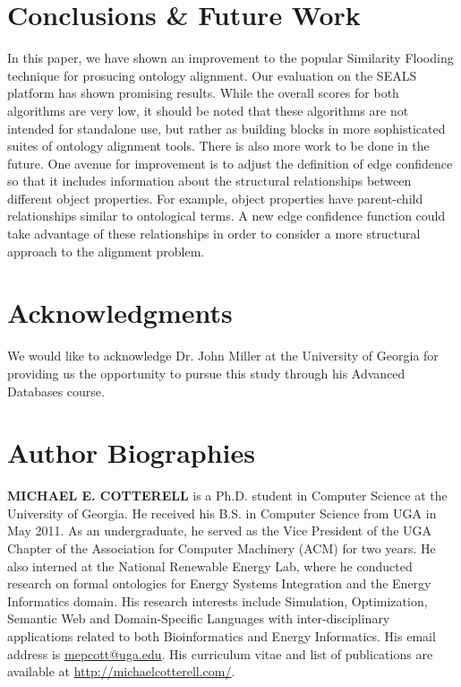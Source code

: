 \documentclass[letterpaper,twocolumn,12pt]{article}
\begin{document}
\section{Conclusions \& Future Work}
\label{sec:conclusions}
In this paper, we have shown an improvement to the popular
Similarity Flooding technique for prosucing ontology alignment.
Our evaluation on the SEALS platform has shown promising results. While the overall
scores for both algorithms are very low, it should be noted that these algorithms
are not intended for standalone use, but rather as building blocks in more
sophisticated suites of ontology alignment tools. There is also more work
to be done in the future.
One avenue for improvement is to adjust the definition of edge confidence so that it 
includes information about the structural relationships between different object properties.
For example, object properties have parent-child relationships similar to ontological terms.
A new edge confidence function could take advantage of these relationships in order to 
consider a more structural approach to the alignment problem.


\section*{Acknowledgments}

We would like to acknowledge Dr. John Miller at the University of Georgia for providing us the opportunity to pursue this study through his Advanced Databases course. 

%

 

\section*{Author Biographies} 
\vspace{8 pt}
\noindent \textbf{MICHAEL E. COTTERELL} is a Ph.D. student in Computer Science at the University of Georgia. 
He received his B.S. in Computer Science from UGA in May 2011. 
As an undergraduate, he served as the Vice President of the UGA Chapter of the Association for Computer Machinery (ACM) for two years. 
He also interned at the National Renewable Energy Lab, where he conducted research on formal ontologies for Energy Systems Integration and the Energy Informatics domain. 
His research interests include Simulation, Optimization, Semantic Web and Domain-Specific Languages with inter-disciplinary applications related to both Bioinformatics and Energy Informatics.
His email address is \href{mailto:mepcott@uga.edu}{mepcott@uga.edu}.
His curriculum vitae and list of publications are available at \url{http://michaelcotterell.com/}.
\end{document}
